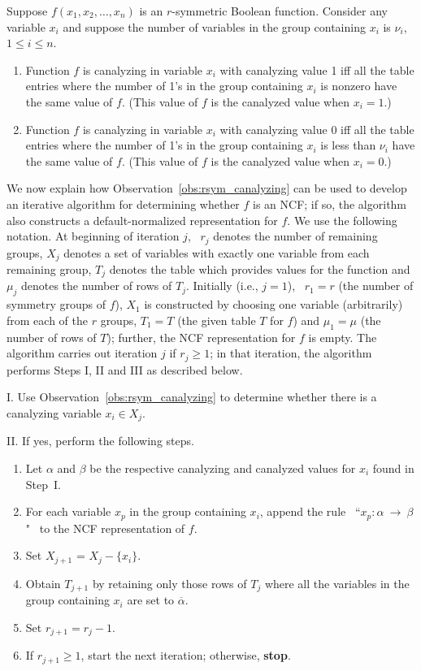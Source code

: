 \begin{observation}\label{obs:rsym_canalyzing}
Suppose $f(x_1, x_2, \ldots, x_n)$ is an $r$-symmetric Boolean function.
Consider any variable $x_i$ and suppose
the number of variables in the group
containing $x_i$ is $\nu_i$, $1 \leq i \leq n$.
\begin{enumerate}
\item Function $f$ is canalyzing in variable $x_i$
with canalyzing value 1 iff all the table entries where the number
of 1's in the group containing $x_i$ is nonzero have the same value
of $f$. (This value of $f$ is the canalyzed value when $x_i = 1$.)
\item Function $f$ is canalyzing in variable $x_i$ with
canalyzing value 0 iff all the table entries where the number of
1's in the group containing $x_i$ is less than $\nu_i$ have the same
value of $f$. (This value of $f$ is the canalyzed value when $x_i = 0$.)
\QED
\end{enumerate}
\end{observation}
We now explain how Observation~\ref{obs:rsym_canalyzing} can be
used to develop an iterative algorithm for determining whether 
$f$ is an NCF; if so, the algorithm also constructs a default-normalized 
representation for $f$.
We use the following notation.
At beginning of iteration $j$,~
$r_j$ denotes the number of remaining groups,
$X_j$ denotes a set of variables with
exactly one variable from each remaining group,
$T_j$ denotes the table which provides values for the function and
$\mu_j$ denotes the number of rows of $T_j$.
Initially (i.e., $j = 1$),~ $r_1 = r$ (the number of symmetry groups of $f$),
$X_1$ is constructed by choosing one 
variable (arbitrarily) from each of the $r$ groups,
$T_1 = T$ (the given table $T$ for $f$) and 
$\mu_1 = \mu$ (the number of rows of $T$);
further, the NCF representation for $f$ is empty.
The algorithm carries out iteration $j$ if $r_j \geq 1$; 
in that iteration, the algorithm performs Steps I, II and III
as described below.

\smallskip
\noindent
I. Use Observation~\ref{obs:rsym_canalyzing} to determine whether there is
a canalyzing variable $x_i \in X_j$. 

\smallskip
\noindent
II. If yes, perform the following steps. 
\begin{enumerate}
\item Let $\alpha$ and $\beta$ be the respective canalyzing and 
canalyzed values for $x_i$ found in Step~I. 
\item For each variable $x_p$ in the group containing $x_i$, append the rule~
``$x_p : \alpha ~\longrightarrow~ \beta$"~ to the NCF representation of $f$.
\item Set $X_{j+1}$ = $X_j - \{x_i\}$.  
\item Obtain $T_{j+1}$ by retaining only those rows of $T_j$ where all the
variables in the group containing $x_i$ are set to $\overline{\alpha}$. 
\item Set $r_{j+1} = r_j - 1$.
\item If $r_{j+1} \geq 1$, start the next iteration; 
      otherwise, \textbf{stop}.
\end{enumerate}

